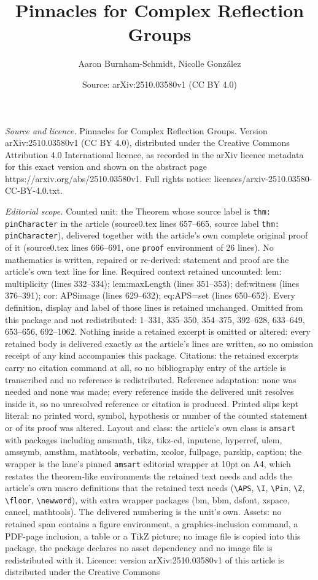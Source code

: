 \documentclass[10pt,a4paper]{amsart}
\title[Pinnacles for Complex Reflection Groups]{Pinnacles for Complex Reflection Groups}
\author{Aaron Burnham-Schmidt, Nicolle Gonz\'alez}
\date{Source: arXiv:2510.03580v1 (CC BY 4.0)}
\begin{document}
\maketitle

\noindent\emph{Source and licence.} Pinnacles for Complex Reflection Groups. Version arXiv:2510.03580v1 (CC BY 4.0), distributed under the Creative Commons Attribution 4.0 International licence, as recorded in the arXiv licence metadata for this exact version and shown on the abstract page https://arxiv.org/abs/2510.03580v1. Full rights notice: licenses/arxiv-2510.03580-CC-BY-4.0.txt.\par\smallskip

\noindent\textit{Editorial scope.} Counted unit: the Theorem whose source label is \texttt{thm: pinCharacter} in the article (source0.tex lines 657--665, source label \texttt{thm: pinCharacter}), delivered together with the article's own complete original proof of it (source0.tex lines 666--691, one \texttt{proof} environment of 26 lines). No mathematics is written, repaired or re-derived: statement and proof are the article's own text line for line. Required context retained uncounted: lem: multiplicity (lines 332--334); lem:maxLength (lines 351--353); def:witness (lines 376--391); cor: APSimage (lines 629--632); eq:APS=set (lines 650--652). Every definition, display and label of those lines is retained unchanged. Omitted from this package and not redistributed: 1--331, 335--350, 354--375, 392--628, 633--649, 653--656, 692--1062. Nothing inside a retained excerpt is omitted or altered: every retained body is delivered exactly as the article's lines are written, so no omission receipt of any kind accompanies this package. Citations: the retained excerpts carry no citation command at all, so no bibliography entry of the article is transcribed and no reference is redistributed. Reference adaptation: none was needed and none was made; every reference inside the delivered unit resolves inside it, so no unresolved reference or citation is produced. Printed slips kept literal: no printed word, symbol, hypothesis or number of the counted statement or of its proof was altered. Layout and class: the article's own class is \texttt{amsart} with packages including amsmath, tikz, tikz-cd, inputenc, hyperref, ulem, amssymb, amsthm, mathtools, verbatim, xcolor, fullpage, parskip, caption; the wrapper is the lane's pinned \texttt{amsart} editorial wrapper at 10pt on A4, which restates the theorem-like environments the retained text needs and adds the article's own macro definitions that the retained text needs (\texttt{\textbackslash APS}, \texttt{\textbackslash I}, \texttt{\textbackslash Pin}, \texttt{\textbackslash Z}, \texttt{\textbackslash floor}, \texttt{\textbackslash newword}), with extra wrapper packages (bm, bbm, dsfont, xspace, cancel, mathtools). The delivered numbering is the unit's own. Assets: no retained span contains a figure environment, a graphics-inclusion command, a PDF-page inclusion, a table or a TikZ picture; no image file is copied into this package, the package declares no asset dependency and no image file is redistributed with it. Licence: version arXiv:2510.03580v1 of this article is distributed under the Creative Commons 
\end{document}
